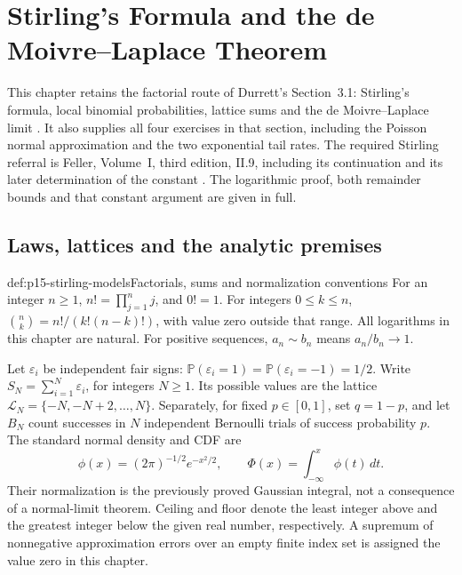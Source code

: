 \chapter{Stirling's Formula and the de Moivre--Laplace Theorem}
\label{sec:p15-de-moivre-laplace-and-stirling}

This chapter retains the factorial route of Durrett's Section~3.1:
Stirling's formula, local binomial probabilities, lattice sums and
the de Moivre--Laplace limit
\cite[pp.~113--115]{DurrettPTEAuthor2019}.
It also supplies all four exercises in that section, including the
Poisson normal approximation and the two exponential tail rates.
The required Stirling referral is Feller, Volume~I, third edition,
II.9, including its continuation and its later determination of the
constant \cite[pp.~51--54, 179--181]{Feller1968ProbabilityI}.
The logarithmic proof, both remainder bounds and that constant
argument are given in full.

\section{Laws, lattices and the analytic premises}
\label{sec:p15-stirling-premises}

\begin{hbdefinition}{def:p15-stirling-models}{Factorials, sums and normalization conventions}
For an integer \(n\geq1\), \(n!=\prod_{j=1}^n j\), and \(0!=1\).
For integers \(0\leq k\leq n\),
\(\binom nk=n!/(k!(n-k)!)\), with value zero outside that range.
All logarithms in this chapter are natural. For positive sequences,
\(a_n\sim b_n\) means \(a_n/b_n\to1\).

Let \(\varepsilon_i\) be independent fair signs:
\(\mathbb P(\varepsilon_i=1)=\mathbb P(\varepsilon_i=-1)=1/2\).
Write \(S_N=\sum_{i=1}^N\varepsilon_i\), for integers \(N\geq1\).
Its possible values are the lattice
\(\mathcal L_N=\{-N,-N+2,\ldots,N\}\).
Separately, for fixed \(p\in[0,1]\), set \(q=1-p\), and let
\(B_N\) count successes in \(N\) independent Bernoulli trials
of success probability \(p\).
The standard normal density and CDF are
\[
 \phi(x)=(2\pi)^{-1/2}e^{-x^2/2},\qquad
 \Phi(x)=\int_{-\infty}^x\phi(t)\,dt.
\]
Their normalization is the previously proved Gaussian integral,
not a consequence of a normal-limit theorem.
Ceiling and floor denote the least integer above and the greatest
integer below the given real number, respectively.
A supremum of nonnegative approximation errors over an empty
finite index set is assigned the value zero in this chapter.
\end{hbdefinition}

